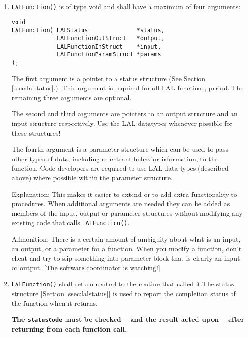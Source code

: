 \documentclass[]{ligodcc}
\begin{document}
\begin{enumerate}

\item
{\tt LALFunction()} is of type void and shall have a maximum of
four arguments:

\begin{verbatim}
void 
LALFunction( LALStatus              *status, 
             LALFunctionOutStruct   *output,
             LALFunctionInStruct    *input,
             LALFunctionParamStruct *params
);
\end{verbatim}

The first argument is a  pointer to a status structure (See Section
\ref{ssec:lalstatus}.). This argument is required for all LAL functions, period. The
remaining three arguments are optional. 

The second and third arguments are pointers to an output structure and
an input structure respectively.  Use the LAL datatypes whenever
possible for these structures!

The fourth argument is a parameter structure which can be used to pass
other types of data, including re-entrant behavior information, to the
function. Code developers are required to use LAL data types
(described above) where possible within the parameter structure. 

Explanation: This makes it easier to extend or to add extra
functionality to procedures. When additional arguments are needed they
can be added as members of the input, output or parameter structures
without modifying any existing code that calls {\tt LALFunction()}.

Admonition: There is a certain amount of ambiguity about what is an
input, an output, or a parameter for a function. When you modify a
function, don't cheat and try to slip something into parameter block
that is clearly an input or output.  [The software coordinator is
watching!]

\item
{\tt LALFunction()} shall return control to the routine that called
it.The status structure [Section \ref{ssec:lalstatus}] is used to
report the completion status of the function when it returns. 

{\bf The {\tt statusCode} must be checked -- and the result acted upon
-- after returning from each function call.}


\end{enumerate}
\end{document}
